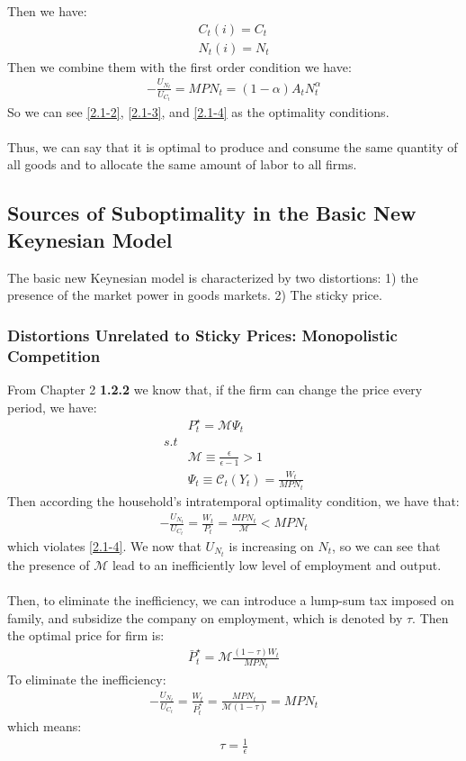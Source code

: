 \documentclass{article}
\numberwithin{equation}{section}
\begin{document}
Then we have:
	\begin{align}
		C_t(i) = C_t \label{2.1-2}\\
		N_t(i) = N_t \label{2.1-3}
	\end{align}
Then we combine them with the first order condition we have:
	\begin{align}
		-\frac{U_{N_t}}{U_{C_t}} = MPN_t = (1 - \alpha)A_t N^{\alpha}_t \label{2.1-4}
	\end{align}
So we can see \eqref{2.1-2}, \eqref{2.1-3}, and \eqref{2.1-4} as the optimality conditions.\\\\
Thus, we can say that it is optimal to produce and consume the same quantity of all goods and to allocate the same amount of labor to all firms.


\subsection{Sources of Suboptimality in the Basic New Keynesian Model}
The basic new Keynesian model is characterized by two distortions: 1) the presence of the market power in goods markets. 2) The sticky price. 

\subsubsection{Distortions Unrelated to Sticky Prices: Monopolistic Competition}
From Chapter 2 \textbf{1.2.2} we know that, if the firm can change the price every period, we have:
	\begin{align*}
		&P^\star_t = \mathscr{M} \Psi_t\\
		s.t&\\
		&\mathscr{M} \equiv \frac{\epsilon}{\epsilon-1} > 1\\
		&\Psi_t \equiv \mathscr{C}_t(Y_t) = \frac{W_t}{MPN_t}
	\end{align*}
Then according the household's intratemporal optimality condition, we have that:
	\begin{align*}
		-\frac{U_{N_t}}{U_{C_t}} = \frac{W_t}{P_t} = \frac{MPN_t}{\mathscr{M}} < MPN_t
	\end{align*}
which violates \eqref{2.1-4}. We now that $U_{N_t}$ is increasing on $N_t$, so we can see that the presence of $\mathscr{M}$ lead to an inefficiently low level of employment and output.\\\\
Then, to eliminate the inefficiency, we can introduce a lump-sum tax imposed on family, and subsidize the company on employment, which is denoted by $\tau$. Then the optimal price for firm is:
	\begin{align*}
		\bar{P}^\star_t = \mathscr{M} \frac{(1 - \tau)W_t}{MPN_t}
	\end{align*} 
To eliminate the inefficiency:
	\begin{align*}
		-\frac{U_{N_t}}{U_{C_t}} = \frac{W_t}{\bar{P}^\star_t} = \frac{MPN_t}{\mathscr{M}(1 - \tau)} = MPN_t 
	\end{align*}
which means:
	\begin{align*}
		\tau = \frac{1}{\epsilon}
	\end{align*}
\end{document}
